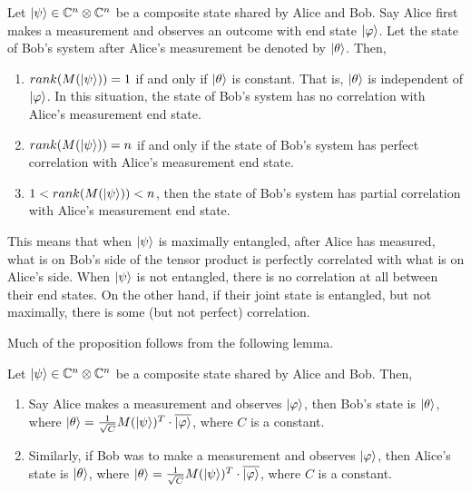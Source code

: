 \begin{prop}
\label{entanglement-rank}
Let $\ket{\psi} \in \mathbb{C}^n \otimes \mathbb{C}^{n}$ be a composite state shared by Alice and Bob. Say Alice first makes a measurement and observes an outcome with end state $\ket{\varphi}$. Let the state of Bob's system after Alice's measurement be denoted by $\ket{\theta}$. Then,
\begin{enumerate}
    \item $rank(M(\ket{\psi}))=1$ if and only if $\ket{\theta}$ is constant.  That is, $\ket{\theta}$ is independent of $\ket{\varphi}$. In this situation, the state of Bob's system has no correlation with Alice's measurement end state.
    \item $rank(M(\ket{\psi}))=n$ if and only if the state of Bob's system has perfect correlation with Alice's measurement end state.
    \item $1<rank(M(\ket{\psi}))<n$, then the state of Bob's system has partial correlation with Alice's measurement end state.
\end{enumerate}
\end{prop}

This means that when $\ket{\psi}$ is maximally entangled, after Alice has measured, what is on Bob's side of the tensor product is perfectly correlated with what is on Alice's side.  When $\ket{\psi}$ is not entangled, there is no correlation at all between their end states.  On the other hand, if their joint state is entangled, but not maximally, there is some (but not perfect) correlation.  

Much of the proposition follows from the following lemma.  




\begin{lemma}
\label{end state lemma}
Let $\ket{\psi} \in \mathbb{C}^n \otimes \mathbb{C}^{n}$ be a composite state shared by Alice and Bob.  Then,
\begin{enumerate}
\item Say Alice makes a measurement and observes $\ket{\varphi}$, then Bob's state is $\ket{\theta}$, where $\ket{\theta}=\frac{1}{\sqrt{C}}M(\ket{\psi})^T \cdot \overline{\ket{\varphi}}$, where $C$ is a constant.
\item Similarly, if Bob was to make a measurement and observes $\ket{\varphi}$, then Alice's state is $\ket{\theta}$, where $\ket{\theta}=\frac{1}{\sqrt{C}}M(\ket{\psi})^T\cdot \overline{\ket{\varphi}}$, where $C$ is a constant.\\

\end{enumerate}
\end{lemma}

